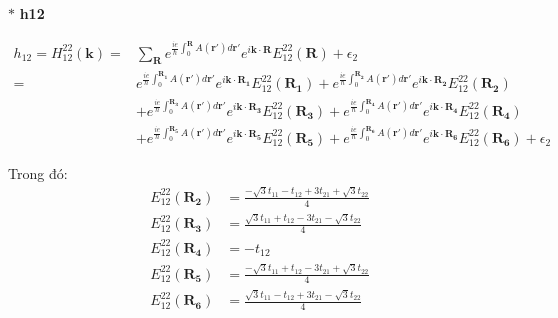 \documentclass{report}
\begin{document}
$\ast$ \textbf{h12}

\begin{align*}
	h_{12} = H_{12}^{22}(\textbf{k})  = & \sum_{\textbf{R}} e^{\frac{ie}{\hbar}\int_{0}^{\mathbf{R}}A(\mathbf{r'})d\mathbf{r'}}e^{i\mathbf{k\cdot R}} E_{12}^{22}(\mathbf{R}) + \epsilon_2                                                                                                                 \\
	=                                   & e^{\frac{ie}{\hbar}\int_{0}^{\mathbf{R_1}}A(\mathbf{r'})d\mathbf{r'}}e^{i\mathbf{k\cdot R_1}} E_{12}^{22}(\mathbf{R_1}) + e^{\frac{ie}{\hbar}\int_{0}^{\mathbf{R_2}}A(\mathbf{r'})d\mathbf{r'}}e^{i\mathbf{k\cdot R_2}} E_{12}^{22}(\mathbf{R_2})                \\
	                                    & + e^{\frac{ie}{\hbar}\int_{0}^{\mathbf{R_3}}A(\mathbf{r'})d\mathbf{r'}}e^{i\mathbf{k\cdot R_3}} E_{12}^{22}(\mathbf{R_3}) + e^{\frac{ie}{\hbar}\int_{0}^{\mathbf{R_4}}A(\mathbf{r'})d\mathbf{r'}}e^{i\mathbf{k\cdot R_4}} E_{12}^{22}(\mathbf{R_4})              \\
	                                    & + e^{\frac{ie}{\hbar}\int_{0}^{\mathbf{R_5}}A(\mathbf{r'})d\mathbf{r'}}e^{i\mathbf{k\cdot R_5}} E_{12}^{22}(\mathbf{R_5}) + e^{\frac{ie}{\hbar}\int_{0}^{\mathbf{R_6}}A(\mathbf{r'})d\mathbf{r'}}e^{i\mathbf{k\cdot R_6}} E_{12}^{22}(\mathbf{R_6}) + \epsilon_2
\end{align*}

\noindent Trong đó:
\begin{align*}
	E_{12}^{22}(\mathbf{R_2}) & = \frac{-\sqrt{3}t_{11} - t_{12} + 3t_{21} + \sqrt{3}t_{22}}{4}  \\
	E_{12}^{22}(\mathbf{R_3}) & = \frac{\sqrt{3}t_{11} + t_{12} - 3 t_{21} -\sqrt{3}t_{22}}{4}   \\
	E_{12}^{22}(\mathbf{R_4}) & = -t_{12}                                                        \\
	E_{12}^{22}(\mathbf{R_5}) & = \frac{-\sqrt{3}t_{11} + t_{12} - 3 t_{21} + \sqrt{3}t_{22}}{4} \\
	E_{12}^{22}(\mathbf{R_6}) & = \frac{\sqrt{3}t_{11} - t_{12} + 3 t_{21} - \sqrt{3}t_{22}}{4}  \\
\end{align*}
\end{document}

